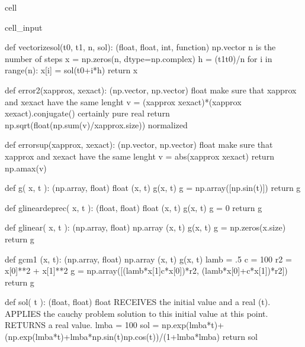 \documentclass[letterpaper,10pt,english]{jupyterBook}
\begin{document}
\begin{sphinxuseclass}{cell}
\begin{sphinxVerbatimInput}
\begin{sphinxuseclass}{cell_input}
\begin{sphinxVerbatim}[commandchars=\\\{\}]
def vectorize\PYGZus{}sol(t0, t1, n, sol):
    \PYGZsq{}\PYGZsq{}\PYGZsq{}
    (float, float, int, function) \PYGZhy{}\PYGZgt{} np.vector
    n is the number of steps
    \PYGZsq{}\PYGZsq{}\PYGZsq{}
    x = np.zeros(n, dtype=np.complex\PYGZus{})
    h = (t1\PYGZhy{}t0)/n
    for i in range(n):
        x[i] = sol(t0+i*h)
    return x

def error\PYGZus{}2(x\PYGZus{}approx, x\PYGZus{}exact):
    \PYGZsq{}\PYGZsq{}\PYGZsq{} (np.vector, np.vector) \PYGZhy{}\PYGZgt{} float \PYGZsq{}\PYGZsq{}\PYGZsq{}
    \PYGZsh{}make sure that x\PYGZus{}approx and x\PYGZus{}exact have the same lenght
    v = (x\PYGZus{}approx \PYGZhy{} x\PYGZus{}exact)*(x\PYGZus{}approx \PYGZhy{} x\PYGZus{}exact).conjugate()
    \PYGZsh{}\PYGZca{}certainly pure real
    return np.sqrt(float(np.sum(v)/x\PYGZus{}approx.size)) \PYGZsh{}normalized

def error\PYGZus{}sup(x\PYGZus{}approx, x\PYGZus{}exact):
    \PYGZsq{}\PYGZsq{}\PYGZsq{} (np.vector, np.vector) \PYGZhy{}\PYGZgt{} float \PYGZsq{}\PYGZsq{}\PYGZsq{}
    \PYGZsh{}make sure that x\PYGZus{}approx and x\PYGZus{}exact have the same lenght
    v = abs(x\PYGZus{}approx \PYGZhy{} x\PYGZus{}exact)
    return np.amax(v)

def g( x, t ):
    \PYGZsq{}\PYGZsq{}\PYGZsq{} (np.array, float) \PYGZhy{}\PYGZgt{} float
        (x, t) \PYGZhy{}\PYGZgt{} g(x, t)
    \PYGZsq{}\PYGZsq{}\PYGZsq{}
    g = np.array([np.sin(t)])
    return g

def g\PYGZus{}linear\PYGZus{}deprec( x, t ):
    \PYGZsq{}\PYGZsq{}\PYGZsq{} (float, float) \PYGZhy{}\PYGZgt{} float
        (x, t) \PYGZhy{}\PYGZgt{} g(x, t)
    \PYGZsq{}\PYGZsq{}\PYGZsq{}
    g = 0
    return g

def g\PYGZus{}linear( x, t ):
    \PYGZsq{}\PYGZsq{}\PYGZsq{} (np.array, float) \PYGZhy{}\PYGZgt{} np.array
        (x, t) \PYGZhy{}\PYGZgt{} g(x, t)
    \PYGZsq{}\PYGZsq{}\PYGZsq{}
    g = np.zeros(x.size)
    return g

def g\PYGZus{}cm1 (x, t):
    \PYGZsq{}\PYGZsq{}\PYGZsq{} (np.array, float) \PYGZhy{}\PYGZgt{} np.array
        (x, t) \PYGZhy{}\PYGZgt{} g(x, t)
    \PYGZsq{}\PYGZsq{}\PYGZsq{}
    lamb = .5
    c = 100
    r\PYGZus{}2 = x[0]**2 + x[1]**2
    g = np.array([(lamb*x[1]\PYGZhy{}c*x[0])*r\PYGZus{}2, \PYGZhy{}(lamb*x[0]+c*x[1])*r\PYGZus{}2])
    return g

def sol( t ):
    \PYGZsq{}\PYGZsq{}\PYGZsq{} (float, float) \PYGZhy{}\PYGZgt{} float
    RECEIVES the initial value and a real (t).
    APPLIES the cauchy problem solution to this initial value at this point.
    RETURNS a real value.
    \PYGZsq{}\PYGZsq{}\PYGZsq{}
    lmba = 100
    sol = np.exp(\PYGZhy{}lmba*t)+(np.exp(\PYGZhy{}lmba*t)+lmba*np.sin(t)\PYGZhy{}np.cos(t))/(1+lmba*lmba)
    return sol


\end{sphinxVerbatim}
\end{sphinxuseclass}
\end{sphinxVerbatimInput}
\end{sphinxuseclass}
\end{document}
